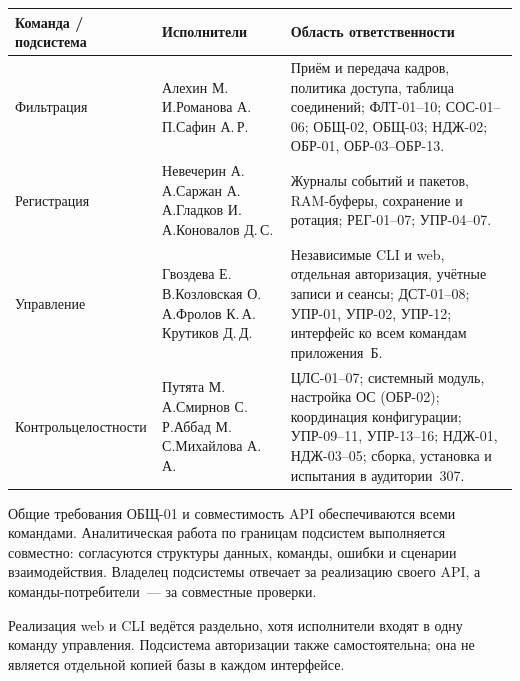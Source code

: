 \documentclass[12pt,a4paper,final]{article}
\renewcommand{\arraystretch}{1.15}
\begin{document}
{\singlespacing
\renewcommand{\arraystretch}{1.1}
\noindent
\begin{tabular}{@{}L{2.9cm}L{3.6cm}L{9.3cm}@{}}
\toprule
Команда / подсистема & Исполнители & Область ответственности\\
\midrule
Фильтрация & Алехин М.\,И.\newline Романова А.\,П.\newline Сафин А.\,Р. &
Приём и передача кадров, политика доступа, таблица соединений;
ФЛТ-01--10; СОС-01--06; ОБЩ-02, ОБЩ-03; НДЖ-02; ОБР-01, ОБР-03--ОБР-13.\\
\addlinespace[6pt]
Регистрация &
Невечерин А.\,А.\newline Саржан А.\,А.\newline Гладков И.\,А.\newline Коновалов Д.\,С.  &
Журналы событий и пакетов, RAM-буферы, сохранение и ротация;
РЕГ-01--07; УПР-04--07.\\
\addlinespace[6pt]
Управление &
Гвоздева Е.\,В.\newline Козловская О.\,А.\newline Фролов К.\,А. \newline Крутиков Д.\,Д. &
Независимые CLI и web, отдельная авторизация, учётные записи и сеансы;
ДСТ-01--08; УПР-01, УПР-02, УПР-12; интерфейс ко всем командам приложения~Б.\\
\addlinespace[6pt]
Контроль\newline целостности &
Путята М.\,А.\newline Смирнов С.\,Р.\newline Аббад М.\,С.\newline Михайлова А.\,А. &
ЦЛС-01--07; системный модуль, настройка ОС (ОБР-02); координация конфигурации; УПР-09--11,
УПР-13--16; НДЖ-01, НДЖ-03--05; сборка, установка и испытания
в аудитории~307.\\
\bottomrule
\end{tabular}
\par}
 
\medskip
Общие требования ОБЩ-01 и совместимость API обеспечиваются всеми
командами. Аналитическая работа по границам подсистем выполняется совместно:
согласуются структуры данных, команды, ошибки и сценарии взаимодействия.
Владелец подсистемы отвечает за реализацию своего API, а команды-потребители~—
за совместные проверки.
 
Реализация web и CLI ведётся раздельно, хотя исполнители входят в одну команду
управления. Подсистема авторизации также самостоятельна; она не является
отдельной копией базы в каждом интерфейсе.
\clearpage
\tableofcontents
\clearpage
\end{document}
